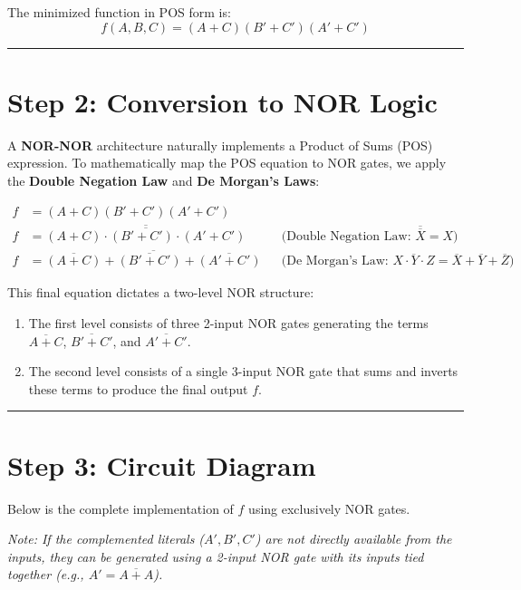 \documentclass[12pt,a3paper]{article}
\begin{document}
\begin{enumerate}
\begin{tcolorbox}[enhanced,breakable,ansbox,colback=cA!4,colframe=cA,boxrule=0.8pt,arc=5pt,title={\textbf{Answer}},fonttitle=\bfseries\color{white},colbacktitle=cA]
The minimized function in POS form is:
\begin{equation}
    f(A, B, C) = (A + C)(B' + C')(A' + C')
\end{equation}

\vspace{0.2cm}
\hrule
\vspace{0.4cm}

\section*{Step 2: Conversion to NOR Logic}

A \textbf{NOR-NOR} architecture naturally implements a Product of Sums (POS) expression. To mathematically map the POS equation to NOR gates, we apply the \textbf{Double Negation Law} and \textbf{De Morgan's Laws}:

\begin{align*}
    f &= (A + C)(B' + C')(A' + C') \\
    f &= \overline{ \overline{ (A + C) \cdot (B' + C') \cdot (A' + C') } } && \text{(Double Negation Law: } \overline{\overline{X}} = X \text{)} \\
    f &= \overline{ \overline{(A + C)} + \overline{(B' + C')} + \overline{(A' + C')} } && \text{(De Morgan's Law: } \overline{X \cdot Y \cdot Z} = \overline{X} + \overline{Y} + \overline{Z} \text{)}
\end{align*}

This final equation dictates a two-level NOR structure:
\begin{enumerate}
    \item The first level consists of three 2-input NOR gates generating the terms $\overline{A+C}$, $\overline{B'+C'}$, and $\overline{A'+C'}$.
    \item The second level consists of a single 3-input NOR gate that sums and inverts these terms to produce the final output $f$.
\end{enumerate}

\vspace{0.2cm}
\hrule
\vspace{0.4cm}

\section*{Step 3: Circuit Diagram}

Below is the complete implementation of $f$ using exclusively NOR gates. 

\textit{Note: If the complemented literals ($A', B', C'$) are not directly available from the inputs, they can be generated using a 2-input NOR gate with its inputs tied together (e.g., $A' = \overline{A + A}$).}


\end{tcolorbox}
\end{enumerate}
\end{document}
